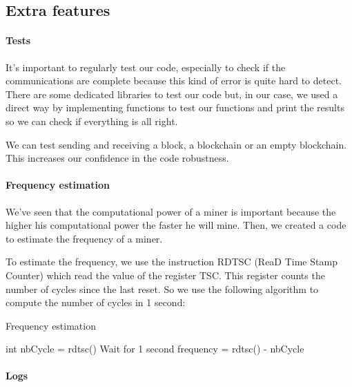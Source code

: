 \subsection{Extra features}

\paragraph{Tests}

It's important to regularly test our code, especially to check if the communications are complete because this kind of error is quite hard to detect. There are some dedicated libraries to test our code but, in our case, we used a direct way by implementing functions to test our functions and print the results so we can check if everything is all right. \newline

We can test sending and receiving a block, a blockchain or an empty blockchain. This increases our confidence in the code robustness.

\paragraph{Frequency estimation}

We've seen that the computational power of a miner is important because the higher his computational power the faster he will mine. Then, we created a code to estimate the frequency of a miner. \newline

To estimate the frequency, we use the instruction RDTSC (ReaD Time Stamp Counter) which read the value of the register TSC. This register counts the number of cycles since the last reset. So we use the following algorithm to compute the number of cycles in 1 second: \newline

\begin{algorithm}
  \caption{Frequency estimation}

  \begin{algorithmic}
    \STATE int nbCycle = rdtsc()
    \STATE Wait for 1 second
    \STATE frequency = rdtsc() - nbCycle
  \end{algorithmic}
\end{algorithm}
\medskip

\paragraph{Logs}

